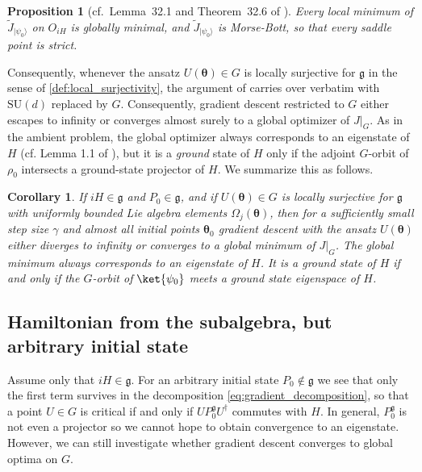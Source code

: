 \documentclass{article}
\renewcommand{\vec}[1]{\ensuremath{\boldsymbol{#1}}}
\newtheorem{proposition}{Proposition}
\newtheorem{corollary}{Corollary}
\begin{document}
\begin{proposition}[cf.\ Lemma~32.1 and Theorem~32.6 of \cite{guillemin_symplectic_2001}]
\label{prop:orbit-morse-bott}
Every local minimum of $\widetilde J_{\lvert\psi_0\rangle}$ on $O_{iH}$ is globally minimal, and $\widetilde J_{\lvert\psi_0\rangle}$ is Morse-Bott, so that every saddle point is strict.
\end{proposition}

Consequently, whenever the ansatz $U(\boldsymbol\theta)\in G$ is locally surjective for $\mathfrak g$ in the sense of \cref{def:local_surjectivity}, the argument of  carries over verbatim with $\mathrm{SU}(d)$ replaced by $G$.
Consequently, gradient descent restricted to $G$ either escapes to infinity or converges almost surely to a global optimizer of $J\vert_G$.
As in the ambient problem, the global optimizer always corresponds to an eigenstate of $H$ (cf. Lemma 1.1 of \cite{Duistermaat83}), but it is a \emph{ground} state of $H$ only if the adjoint $G$-orbit of $\rho_0$ intersects a ground-state projector of $H$. We summarize this as follows.

\begin{corollary}
If $iH\in\mathfrak g$ and $P_0\in\mathfrak g$, and if $U(\vec{\theta})\in G$ is locally surjective for $\mathfrak g$ with uniformly bounded Lie algebra elements $\Omega_j(\boldsymbol\theta)$, then for a sufficiently small step size $\gamma$ and almost all initial points $\vec{\theta}_0$ gradient descent with the ansatz $U(\vec{\theta})$ either diverges to infinity or converges to a global minimum of $J\vert_G$. The global minimum always corresponds to an eigenstate of \(H\). It is a ground state of $H$ if and only if the $G$-orbit of $\ket{\psi_0}$ meets a ground state eigenspace of $H$.
\end{corollary}

\subsection{Hamiltonian from the subalgebra, but arbitrary initial state}
\label{app:subgroup-project}

Assume only that \(iH \in \mathfrak{g}\).
For an arbitrary initial state \(P_0 \notin \mathfrak{g}\) we see that only the first term survives in the decomposition \eqref{eq:gradient_decomposition}, so that a point $U\in G$ is critical if and only if $UP_0^{\mathfrak g}U^\dagger$ commutes with $H$.
In general, \(P_0^{\mathfrak{g}}\) is not even a projector so we cannot hope to obtain convergence to an eigenstate.
However, we can still investigate whether gradient descent converges to global optima on \(G\).
\end{document}
